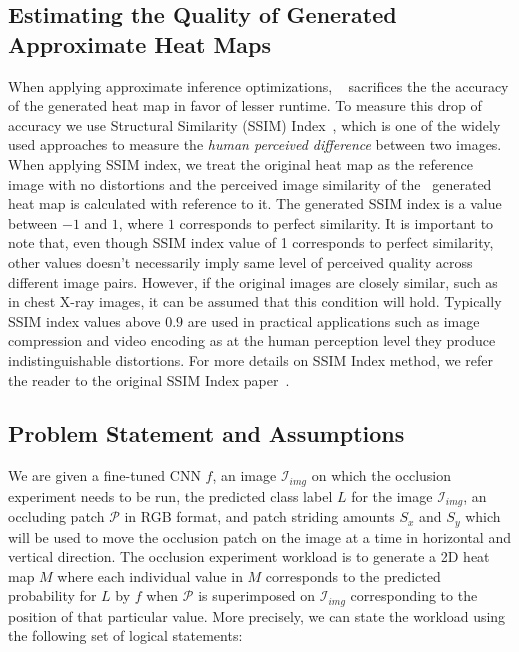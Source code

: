 \subsection{Estimating the Quality of Generated Approximate Heat Maps}

When applying approximate inference optimizations, \system~ sacrifices the the accuracy of the generated heat map in favor of lesser runtime.
To measure this drop of accuracy we use Structural Similarity (SSIM) Index~\cite{wang2004image}, which is one of the widely used approaches to measure the \textit{human perceived difference} between two images.
When applying SSIM index, we treat the original heat map as the reference image with no distortions and the perceived image similarity of the \system~generated heat map is calculated with reference to it.
The generated SSIM index is a value between $-1$ and $1$, where $1$ corresponds to perfect similarity.
It is important to note that, even though SSIM index value of 1 corresponds to perfect similarity, other values doesn't necessarily imply same level of perceived quality across different image pairs.
However, if the original images are closely similar, such as in chest X-ray images, it can be assumed that this condition will hold.
Typically SSIM index values above $0.9$ are used in practical applications such as image compression and video encoding as at the human perception level they produce indistinguishable distortions.
For more details on SSIM Index method, we refer the reader to the original SSIM Index paper~\cite{wang2004image}.


\subsection{Problem Statement and Assumptions}

We are given a fine-tuned CNN $f$, an image $\mathcal{I}_{img}$ on which the occlusion experiment needs to be run, the predicted class label $L$ for the image $\mathcal{I}_{img}$, an occluding patch $\mathcal{P}$ in RGB format, and patch striding amounts $S_{x}$ and $S_{y}$ which will be used to move the occlusion patch on the image at a time in horizontal and vertical direction. The occlusion experiment workload is to generate a 2D heat map $M$ where each individual value in $M$ corresponds to the predicted probability for $L$ by $f$ when $\mathcal{P}$ is superimposed on $\mathcal{I}_{img}$ corresponding to the position of that particular value. More precisely, we can state the workload using the following set of logical statements:


